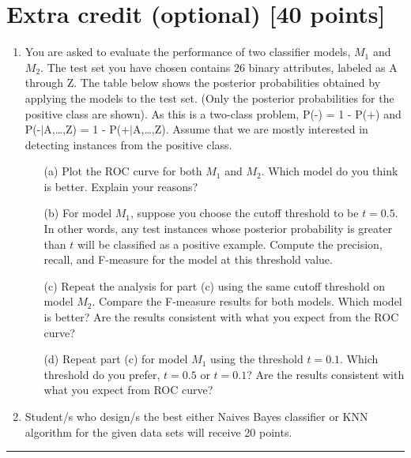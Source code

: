 \documentclass{article}
\newcommand{\sep}{\begin{center}\textcolor{gray}{\rule{\textwidth}{0.75pt}}\end{center}}
\begin{document}
%
\newpage
\section*{Extra credit (optional) [40 points]}

\begin{enumerate}
\item You are asked to evaluate the performance  of two classifier models, $M_1$ and $M_2$. The test set you have chosen contains 26 binary attributes, labeled as A through Z. The table below shows the posterior probabilities obtained by applying the models to the test set. (Only the posterior probabilities for the positive class are shown). As this is a two-class problem, P(-) = 1 - P(+) and P(-$|$A,\ldots,Z) = 1 - P(+$|$A,\ldots,Z). Assume that we are mostly interested in detecting instances from the positive class.

\begin{enumerate}
\item[(a)] Plot the ROC curve for both $M_1$ and $M_2$. Which model do you think is better. Explain your reasons? 

\item[(b)]  For model $M_1$, suppose you choose the cutoff threshold to be $t=0.5$. In other words, any test instances whose posterior probability is greater than $t$ will be classified as a positive example. Compute the precision, recall, and F-measure for the model at this threshold value.

\item[(c)] Repeat the analysis for part (c) using the same cutoff threshold on model $M_2$. Compare the F-measure results for both models. Which model is better? Are the results consistent with what you expect from the ROC curve? 


\item[(d)] Repeat part (c) for model $M_1$ using the threshold  
$t=0.1$. Which threshold do you prefer, $t=0.5$ or $t=0.1$? Are the results consistent with what you expect from ROC curve?

\end{enumerate}

\item Student/s who design/s the best either Naives Bayes classifier or KNN algorithm for the given data sets will receive  20 points.

\end{enumerate}
\sep
\end{document}
